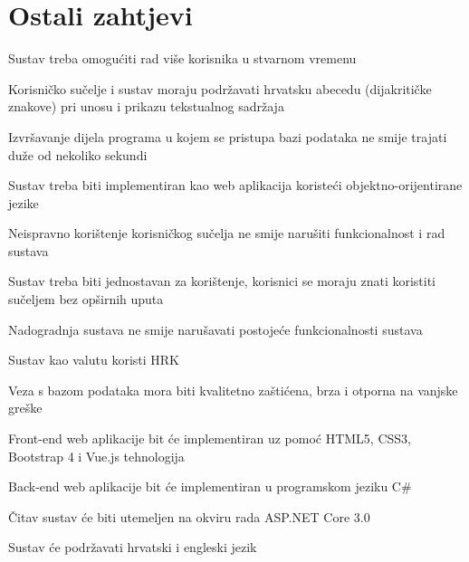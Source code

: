 		\section{Ostali zahtjevi}
		
			\begin{packed_item}
				\item Sustav treba omogućiti rad više korisnika u stvarnom vremenu
				\item Korisničko sučelje i sustav moraju podržavati hrvatsku abecedu (dijakritičke znakove) pri unosu i prikazu tekstualnog sadržaja
				\item Izvršavanje dijela programa u kojem se pristupa bazi podataka ne smije trajati duže od nekoliko sekundi
				\item Sustav treba biti implementiran kao web aplikacija koristeći objektno-orijentirane jezike
				\item Neispravno korištenje korisničkog sučelja ne smije narušiti funkcionalnost i rad sustava
				\item Sustav treba biti jednostavan za korištenje, korisnici se moraju znati koristiti sučeljem bez opširnih uputa
				\item Nadogradnja sustava ne smije narušavati postojeće funkcionalnosti sustava
				\item Sustav kao valutu koristi HRK
				\item Veza s bazom podataka mora biti kvalitetno zaštićena, brza i otporna na vanjske greške
				\item Front-end web aplikacije bit će implementiran uz pomoć HTML5, CSS3, Bootstrap 4 i Vue.js tehnologija
				\item Back-end web aplikacije bit će implementiran u programskom jeziku C\#
				\item Čitav sustav će biti utemeljen na okviru rada ASP.NET Core 3.0
				\item Sustav će podržavati hrvatski i engleski jezik
			\end{packed_item}

			 
			 
			 
	
